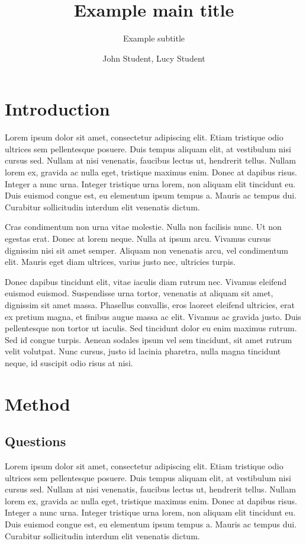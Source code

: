 \documentclass[11pt, a4paper]{resources/JTH}
\title{Example main title}
\subtitle{Example subtitle}
\author{John Student, Lucy Student}
\begin{document}
\maketitle

\tableofcontents

\chapter{Introduction}
\label{chap:introduction}
Lorem ipsum dolor sit amet, consectetur adipiscing elit. Etiam tristique odio ultrices sem pellentesque posuere. Duis tempus aliquam elit, at vestibulum nisi cursus sed. Nullam at nisi venenatis, faucibus lectus ut, hendrerit tellus. Nullam lorem ex, gravida ac nulla eget, tristique maximus enim. Donec at dapibus risus. Integer a nunc urna. Integer tristique urna lorem, non aliquam elit tincidunt eu. Duis euismod congue est, eu elementum ipsum tempus a. Mauris ac tempus dui. Curabitur sollicitudin interdum elit venenatis dictum\cite{davidson1996c}. 

Cras condimentum non urna vitae molestie. Nulla non facilisis nunc. Ut non egestas erat. Donec at lorem neque. Nulla at ipsum arcu. Vivamus cursus dignissim nisi sit amet semper. Aliquam non venenatis arcu, vel condimentum elit. Mauris eget diam ultrices, varius justo nec, ultricies turpis\cite{freeman2002example}.

Donec dapibus tincidunt elit, vitae iaculis diam rutrum nec. Vivamus eleifend euismod euismod. Suspendisse urna tortor, venenatis at aliquam sit amet, dignissim sit amet massa. Phasellus convallis, eros laoreet eleifend ultricies, erat ex pretium magna, et finibus augue massa ac elit. Vivamus ac gravida justo. Duis pellentesque non tortor ut iaculis. Sed tincidunt dolor eu enim maximus rutrum. Sed id congue turpis. Aenean sodales ipsum vel sem tincidunt, sit amet rutrum velit volutpat. Nunc cursus, justo id lacinia pharetra, nulla magna tincidunt neque, id suscipit odio risus at nisi\cite{zloof1977query}.

\chapter{Method}
\label{chap:Method}

\section{Questions}

Lorem ipsum dolor sit amet, consectetur adipiscing elit. Etiam tristique odio ultrices sem pellentesque posuere. Duis tempus aliquam elit, at vestibulum nisi cursus sed. Nullam at nisi venenatis, faucibus lectus ut, hendrerit tellus. Nullam lorem ex, gravida ac nulla eget, tristique maximus enim. Donec at dapibus risus. Integer a nunc urna. Integer tristique urna lorem, non aliquam elit tincidunt eu. Duis euismod congue est, eu elementum ipsum tempus a. Mauris ac tempus dui. Curabitur sollicitudin interdum elit venenatis dictum\cite{beck2003test}.
\end{document}
